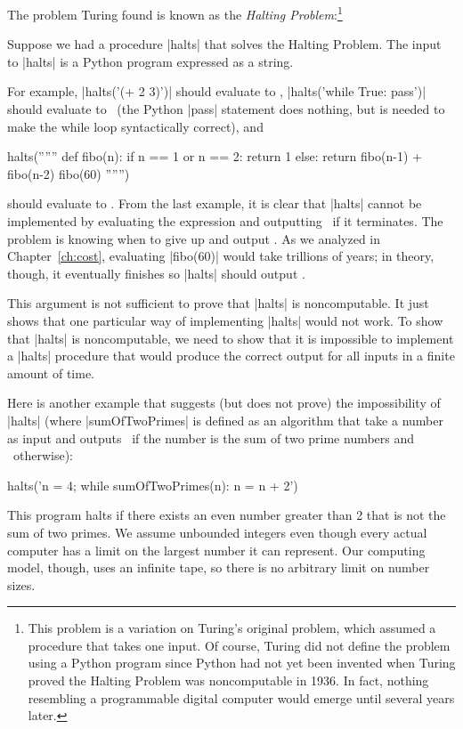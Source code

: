 \begin{schemeregion}
The problem Turing found is known as the \emph{Halting Problem}:\footnote{This problem is a variation on Turing's original problem, which assumed a procedure that takes one input. Of course, Turing did not define the problem using a Python program since Python had not yet been invented when Turing proved the Halting Problem was noncomputable in 1936.  In fact, nothing resembling a programmable digital computer would emerge until several years later.}


Suppose we had a procedure \pycode|halts| that solves the Halting Problem.  The input to \pycode|halts| is a Python program expressed as a string.  

For example, \pycode|halts('(+ 2 3)')| should evaluate to \True, \pycode|halts('while True: pass')| should evaluate to \False\ (the Python \pycode|pass| statement does nothing, but is needed to make the while loop syntactically correct), and
\begin{pythoncode}
halts(''''''
        def fibo(n):
           if n == 1 or n == 2: return 1
           else: return fibo(n-1) + fibo(n-2)
        fibo(60)
    '''''')
\end{pythoncode}
should evaluate to \True.  From the last example, it is clear that \pycode|halts| cannot be implemented by evaluating the expression and outputting \True\ if it terminates.  The problem is knowing when to give up and output \False.  As we analyzed in Chapter~\ref{ch:cost}, evaluating \pycode|fibo(60)| would take trillions of years; in theory, though, it eventually finishes so \pycode|halts| should output \True.

This argument is not sufficient to prove that \pycode|halts| is noncomputable.  It just shows that one particular way of implementing \pycode|halts| would not work.  To show that \pycode|halts| is noncomputable, we need to show that it is impossible to implement a \pycode|halts| procedure that would produce the correct output for all inputs in a finite amount of time.

Here is another example that suggests (but does not prove) the impossibility of \pycode|halts| (where \pycode|sumOfTwoPrimes| is defined as an algorithm that take a number as input and outputs \True\ if the number is the sum of two prime numbers and \False\ otherwise):
\begin{pythoncode} 
halts('n = 4; while sumOfTwoPrimes(n): n = n + 2')
\end{pythoncode}
This program halts if there exists an even number greater than 2 that is not the sum of two primes.  We assume unbounded integers even though every actual computer has a limit on the largest number it can represent.  Our computing model, though, uses an infinite tape, so there is no arbitrary limit on number sizes.  


\end{schemeregion}

